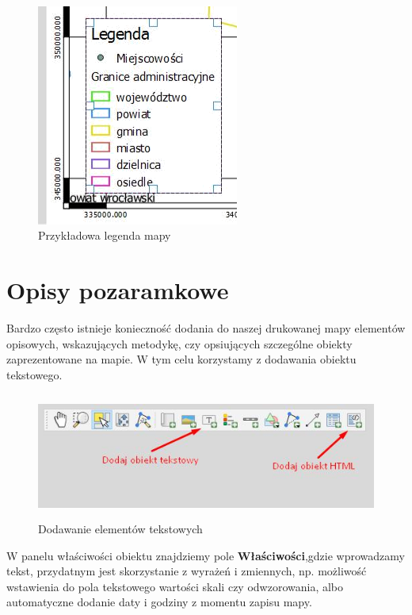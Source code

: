\documentclass[12pt,a4paper]{book}
\begin{document}
\begin{center}
\begin{figure}
\includegraphics[width=6.639cm,height=7.267cm]{008-legenda-przyklad.png}
\caption{Przykładowa legenda mapy}
\end{figure}
\end{center}
\section{Opisy pozaramkowe}
Bardzo często istnieje konieczność dodania do naszej drukowanej mapy elementów opisowych, wskazujących metodykę, czy opsiujących szczególne obiekty zaprezentowane na mapie. W tym celu korzystamy z dodawania obiektu tekstowego.

\begin{center}
\begin{figure}
\includegraphics[width=13.31cm,height=4.128cm]{008-tekstowe.jpg}
\caption{Dodawanie elementów tekstowych}
\end{figure}
\end{center}
W panelu właściwości obiektu znajdziemy pole \textbf{Właściwości},gdzie wprowadzamy tekst, przydatnym jest skorzystanie z wyrażeń i zmiennych, np. możliwość wstawienia do pola tekstowego wartości skali czy odwzorowania, albo automatyczne dodanie daty i godziny z momentu zapisu mapy.
\end{document}
